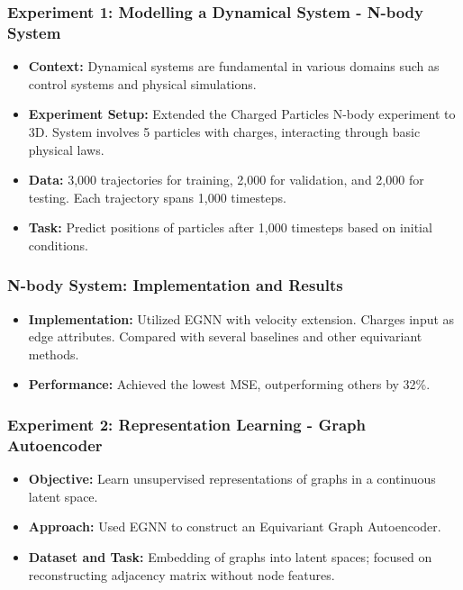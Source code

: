\documentclass[11pt,xcolor={dvipsnames},hyperref={pdftex,pdfpagemode=UseNone,hidelinks,pdfdisplaydoctitle=true},usepdftitle=false]{beamer}
\begin{document}
\begin{frame}
\frametitle{Experiment 1: Modelling a Dynamical System - N-body System}
\begin{itemize}
    \item \textbf{Context:} Dynamical systems are fundamental in various domains such as control systems and physical simulations.
    \item \textbf{Experiment Setup:} Extended the Charged Particles N-body experiment to 3D. System involves 5 particles with charges, interacting through basic physical laws.
    \item \textbf{Data:} 3,000 trajectories for training, 2,000 for validation, and 2,000 for testing. Each trajectory spans 1,000 timesteps.
    \item \textbf{Task:} Predict positions of particles after 1,000 timesteps based on initial conditions.
\end{itemize}
\end{frame}    

\begin{frame}
\frametitle{N-body System: Implementation and Results}
\begin{itemize}
    \item \textbf{Implementation:} Utilized EGNN with velocity extension. Charges input as edge attributes. Compared with several baselines and other equivariant methods.
    \item \textbf{Performance:} Achieved the lowest MSE, outperforming others by 32\%.
\end{itemize}
\end{frame}


\begin{frame}
\frametitle{Experiment 2: Representation Learning - Graph Autoencoder}
\begin{itemize}
    \item \textbf{Objective:} Learn unsupervised representations of graphs in a continuous latent space.
    \item \textbf{Approach:} Used EGNN to construct an Equivariant Graph Autoencoder.
    \item \textbf{Dataset and Task:} Embedding of graphs into latent spaces; focused on reconstructing adjacency matrix without node features.
\end{itemize}
\end{frame}
    
\end{document}
